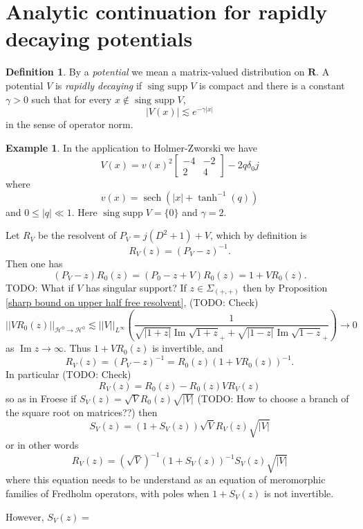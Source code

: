\documentclass[reqno,12pt,letterpaper]{amsart}
\newcommand{\RR}{\mathbf{R}}
\DeclareMathOperator{\singsupp}{sing~supp}
\DeclareMathOperator{\sech}{sech}
\newcommand{\dfn}[1]{\emph{#1}\index{#1}}
\renewcommand{\Im}{\operatorname{Im}}
\theoremstyle{definition}
\newtheorem{definition}[theorem]{Definition}
\newtheorem{example}[theorem]{Example}
\begin{document}
\section{Analytic continuation for rapidly decaying potentials}
\begin{definition}
By a \dfn{potential} we mean a matrix-valued distribution on $\RR$.
A potential $V$ is \dfn{rapidly decaying} if $\singsupp V$ is compact and there is a constant $\gamma > 0$ such that for every $x \notin \singsupp V$,
$$|V(x)| \lesssim e^{-\gamma |x|}$$
in the sense of operator norm.
\end{definition}

\begin{example}
In the application to Holmer-Zworski we have
$$V(x) = v(x)^2\begin{bmatrix}-4 & -2\\2 & 4\end{bmatrix} - 2q\delta_0 j$$
where
$$v(x) = \sech(|x| + \tanh^{-1}(q))$$
and $0 \leq |q| \ll 1$. Here $\singsupp V = \{0\}$ and $\gamma = 2$.
\end{example}

Let $R_V$ be the resolvent of $P_V = j(D^2 + 1) + V$, which by definition is
$$R_V(z) = (P_V - z)^{-1}.$$
Then one has
$$(P_V - z)R_0(z) = (P_0 - z + V)R_0(z) = 1 + VR_0(z).$$
TODO: What if $V$ has singular support?
If $z \in \Sigma_{(+,+)}$ then by Proposition \ref{sharp bound on upper half free resolvent}, (TODO: Check)
$$||VR_0(z)||_{\mathcal H^0 \to \mathcal H^0} \lesssim ||V||_{L^\infty} \left(\frac{1}{\sqrt{|1 + z|} \Im \sqrt{1 + z}_+ + \sqrt{|1 - z|} \Im \sqrt{1 - z}_+}\right) \to 0$$
as $\Im z \to \infty$.
Thus $1 + VR_0(z)$ is invertible, and
$$R_V(z) = (P_V - z)^{-1} = R_0(z)(1 + VR_0(z))^{-1}.$$
In particular (TODO: Check)
$$R_V(z) = R_0(z) - R_0(z)VR_V(z)$$
so as in Froese if $S_V(z) = \sqrt V R_0(z) \sqrt{|V|}$ (TODO: How to choose a branch of the square root on matrices??) then
$$S_V(z) = (1 + S_V(z)) \sqrt V R_V(z) \sqrt{|V|}$$
or in other words
$$R_V(z) = (\sqrt V)^{-1} (1 + S_V(z))^{-1} S_V(z) \sqrt{|V|}$$
where this equation needs to be understand as an equation of meromorphic families of Fredholm operators, with poles when $1 + S_V(z)$ is not invertible.

However, $S_V(z) =$








\printbibliography
\end{document}
